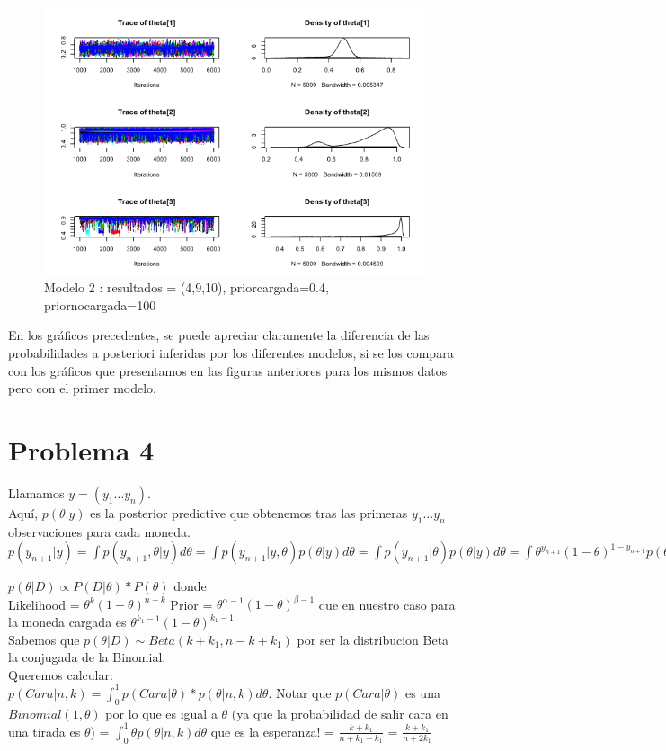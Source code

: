 \documentclass[a4paper]{article}
\begin{document}
\begin{figure}[h!]
\centering
\includegraphics[scale=0.5] {img6.png}
\caption{ Modelo 2 : resultados = (4,9,10), priorcargada=0.4, priornocargada=100 }
\end{figure}

En los gráficos precedentes, se puede apreciar claramente la diferencia de las probabilidades
a posteriori inferidas por los diferentes modelos, si se los compara con los 
gráficos que presentamos en las figuras anteriores para los mismos datos pero con el 
primer modelo.

\newpage
\section {Problema 4}
Llamamos $ y = ( y_1 \dots y_n ) $. \\

Aquí, $ p(\theta | y) $ es la posterior predictive que obtenemos tras las primeras
$ y_1 \dots y_n $ observaciones para cada moneda. \\

$ 
p(y_{n+1} | y) =  \int p(y_{n+1}, \theta | y) d\theta 
			   =  \int p(y_{n+1} | y, \theta) p(\theta | y) d \theta
			   =  \int p(y_{n+1} | \theta) p(\theta | y) d \theta
			   =  \int \theta^{y_{n+1}} (1 - \theta)^{1 - y_{n+1}} p(\theta | y) d \theta
$


$ p(\theta | D) \propto P(D | \theta) * P(\theta) $ donde \\

Likelihood = $\theta^{k}(1-\theta)^{n - k}$
Prior = $\theta^{\alpha - 1}(1-\theta)^{\beta - 1}$ que en nuestro caso para la moneda cargada es $ \theta^{k_1 - 1}(1-\theta)^{k_1 - 1} $ \\
Sabemos que $p(\theta | D) \sim Beta(k + k_1, n - k + k_1)$ por ser la distribucion Beta la conjugada de la Binomial. \\
Queremos calcular: \\
$p(Cara | n, k) 	= \int_{0}^{1} p(Cara | \theta) * p(\theta | n, k) d \theta$. Notar que $p(Cara | \theta)$ es una $Binomial(1, \theta)$ por lo que es igual a $\theta$ (ya que la probabilidad de salir cara en una tirada es $\theta$)
				= $\int_{0}^{1} \theta p(\theta | n, k) d \theta$ que es la esperanza!
				= $\frac {k + k_1}{n + k_1 + k_1}$
				= $\frac {k + k_1}{n + 2k_1}$
\newpage
\end{document}
